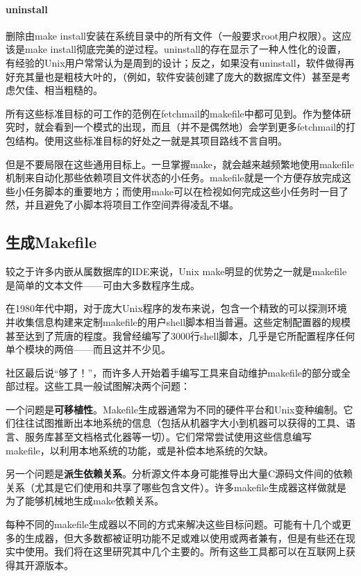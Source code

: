 \documentclass[12pt,oneside]{ctexbook}
\begin{document}
\begin{common-format}
\paragraph{uninstall}
删除由make install安装在系统目录中的所有文件（一般要求root用户权限）。这应该是make install彻底完美的逆过程。uninstall的存在显示了一种人性化的设置，有经验的Unix用户常常认为是周到的设计；反之，如果没有uninstall，软件做得再好充其量也是粗枝大叶的，（例如，软件安装创建了庞大的数据库文件）甚至是考虑欠佳、相当粗糙的。

所有这些标准目标的可工作的范例在fetchmail的makefile中都可见到。作为整体研究时，就会看到一个模式的出现，而且（并不是偶然地）会学到更多fetchmail的打包结构。使用这些标准目标的好处之一就是其项目路线不言自明。

但是不要局限在这些通用目标上。一旦掌握make，就会越来越频繁地使用makefile机制来自动化那些依赖项目文件状态的小任务。makefile就是一个方便存放完成这些小任务脚本的重要地方；而使用make可以在检视如何完成这些小任务时一目了然，并且避免了小脚本将项目工作空间弄得凌乱不堪。


\subsection{生成Makefile}
较之于许多内嵌从属数据库的IDE来说，Unix make明显的优势之一就是makefile是简单的文本文件——可由大多数程序生成。

在1980年代中期，对于庞大Unix程序的发布来说，包含一个精致的可以探测环境并收集信息构建来定制makefile的用户shell脚本相当普遍。这些定制配置器的规模甚至达到了荒唐的程度。我曾经编写了3000行shell脚本，几乎是它所配置程序任何单个模块的两倍——而且这并不少见。

社区最后说“够了！”，而许多人开始着手编写工具来自动维护makefile的部分或全部过程。这些工具一般试图解决两个问题：

一个问题是\textbf{可移植性}。Makefile生成器通常为不同的硬件平台和Unix变种编制。它们往往试图推断出本地系统的信息（包括从机器字大小到机器可以获得的工具、语言、服务库甚至文档格式化器等一切）。它们常常尝试使用这些信息编写makefile，以利用本地系统的功能，或是补偿本地系统的欠缺。

另一个问题是\textbf{派生依赖关系}。分析源文件本身可能推导出大量C源码文件间的依赖关系（尤其是它们使用和共享了哪些包含文件）。许多makefile生成器这样做就是为了能够机械地生成make依赖关系。

每种不同的makefile生成器以不同的方式来解决这些目标问题。可能有十几个或更多的生成器，但大多数都被证明功能不足或难以使用或两者兼有，但是有些还在现实中使用。我们将在这里研究其中几个主要的。所有这些工具都可以在互联网上获得其开源版本。


\end{common-format}
\end{document}
